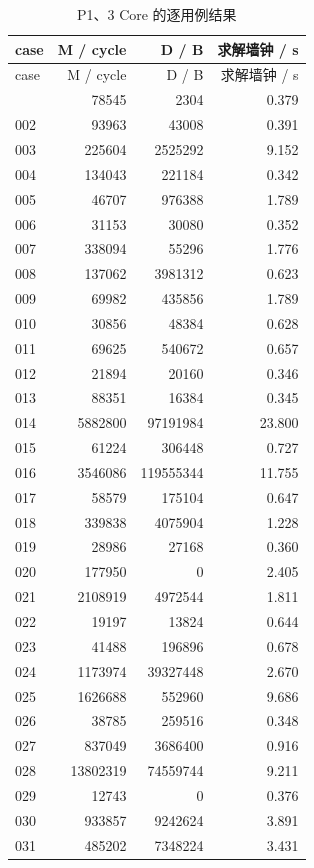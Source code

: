 \documentclass[anonymous,notoc]{gmcm2026}
\begin{document}
\begin{longtable}{lrrr}
\caption{P1、3 Core 的逐用例结果}\\
\toprule
case & M / cycle & D / B & 求解墙钟 / s\\\midrule
\endfirsthead
\toprule
case & M / cycle & D / B & 求解墙钟 / s\\\midrule
\endhead
\bottomrule\endfoot
001 & 78545 & 2304 & 0.379 \\
002 & 93963 & 43008 & 0.391 \\
003 & 225604 & 2525292 & 9.152 \\
004 & 134043 & 221184 & 0.342 \\
005 & 46707 & 976388 & 1.789 \\
006 & 31153 & 30080 & 0.352 \\
007 & 338094 & 55296 & 1.776 \\
008 & 137062 & 3981312 & 0.623 \\
009 & 69982 & 435856 & 1.789 \\
010 & 30856 & 48384 & 0.628 \\
011 & 69625 & 540672 & 0.657 \\
012 & 21894 & 20160 & 0.346 \\
013 & 88351 & 16384 & 0.345 \\
014 & 5882800 & 97191984 & 23.800 \\
015 & 61224 & 306448 & 0.727 \\
016 & 3546086 & 119555344 & 11.755 \\
017 & 58579 & 175104 & 0.647 \\
018 & 339838 & 4075904 & 1.228 \\
019 & 28986 & 27168 & 0.360 \\
020 & 177950 & 0 & 2.405 \\
021 & 2108919 & 4972544 & 1.811 \\
022 & 19197 & 13824 & 0.644 \\
023 & 41488 & 196896 & 0.678 \\
024 & 1173974 & 39327448 & 2.670 \\
025 & 1626688 & 552960 & 9.686 \\
026 & 38785 & 259516 & 0.348 \\
027 & 837049 & 3686400 & 0.916 \\
028 & 13802319 & 74559744 & 9.211 \\
029 & 12743 & 0 & 0.376 \\
030 & 933857 & 9242624 & 3.891 \\
031 & 485202 & 7348224 & 3.431 \\

\end{longtable}
\end{document}
